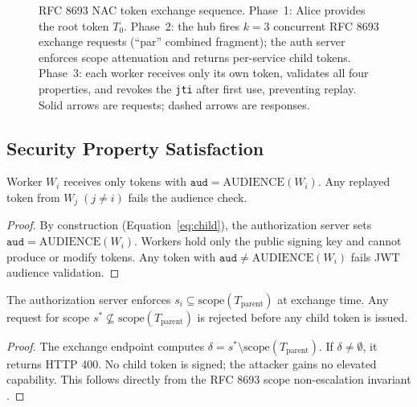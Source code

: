 \documentclass[journal]{IEEEtran}
\begin{document}
\begin{figure}[t]
\caption{RFC 8693 NAC token exchange sequence. Phase~1: Alice provides the
root token $T_0$. Phase~2: the hub fires $k=3$ concurrent RFC 8693 exchange
requests (``par'' combined fragment); the auth server enforces scope
attenuation and returns per-service child tokens. Phase~3: each worker
receives only its own token, validates all four properties, and revokes the
\texttt{jti} after first use, preventing replay.
Solid arrows are requests; dashed arrows are responses.}
\label{fig:nac_seq}
\end{figure}

\subsection{Security Property Satisfaction}

\begin{theorem}
Worker $W_i$ receives only tokens with $\texttt{aud}=\mathrm{AUDIENCE}(W_i)$.
Any replayed token from $W_j\;(j\neq i)$ fails the audience check.
\end{theorem}
\begin{proof}
By construction (Equation~\ref{eq:child}), the authorization server sets
$\texttt{aud}=\mathrm{AUDIENCE}(W_i)$. Workers hold only the public signing
key and cannot produce or modify tokens. Any token with
$\texttt{aud}\neq\mathrm{AUDIENCE}(W_i)$ fails JWT audience validation.
\end{proof}

\begin{theorem}
The authorization server enforces $s_i \subseteq \mathrm{scope}(T_{\mathrm{parent}})$
at exchange time. Any request for scope $s^* \not\subseteq
\mathrm{scope}(T_{\mathrm{parent}})$ is rejected before any child token is issued.
\end{theorem}
\begin{proof}
The exchange endpoint computes $\delta = s^* \setminus
\mathrm{scope}(T_{\mathrm{parent}})$. If $\delta\neq\emptyset$, it returns HTTP
400. No child token is signed; the attacker gains no elevated capability.
This follows directly from the RFC 8693 scope non-escalation invariant
\cite{rfc8693}.
\end{proof}
\end{document}

